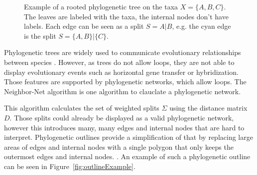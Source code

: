 \begin{figure}
  \centering
  \caption{Example of a rooted phylogenetic tree on the taxa $X = \{A, B, C\}$.
  The leaves are labeled with the taxa, the internal nodes don't have labels.
  Each edge can be seen as a split $S=A|B$, e.g. the cyan edge is the split $S =
  \{A, B\} | \{C\}$.}
  \label{fig:exampleTree}
\end{figure}

Phylogenetic trees are widely used to communicate evolutionary relationships
between species
\cite{mandalComparativeGenomeAnalysis2022,winkworthComparativeAnalysesComplete2022,ayala-usmaWholeGenomeDuplication2021}.
However, as trees do not allow loops, they are not able to display evolutionary
events such as horizontal gene transfer or hybridization. Those features are
supported by phylogenetic networks, which allow loops.  The
Neighbor-Net algorithm \cite{bryantNeighborNetAgglomerativeMethod2004} is one
algorithm to clauclate a phylogenetic network. 

This algorithm calculates the set of weighted splits $\Sigma$ using the distance
matrix $D$. Those splits could already be displayed as a valid phylogenetic
network, however this introduces many, many edges and internal nodes that are
hard to interpret. Phylogenetic outlines provide a simplification of that by
replacing large areas of edges and internal nodes with a single polygon that
only keeps the outermost edges and internal nodes.
\cite{bagciMicrobialPhylogeneticContext2021}. An example of such a phylogenetic
outline can be seen in Figure~\ref{fig:outlineExample}. 

